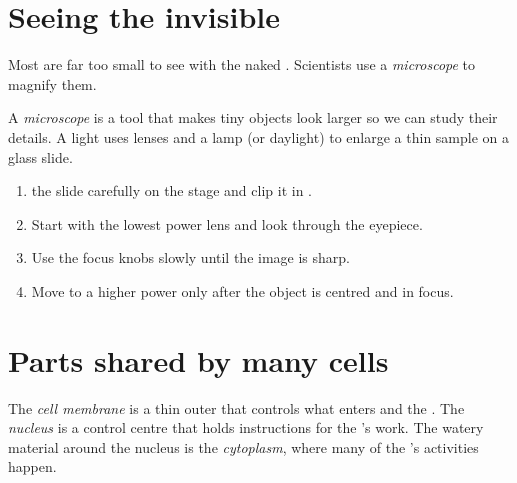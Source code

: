 \section{Seeing the invisible}

Most  are far too small to see with the naked . Scientists use
a \emph{microscope} to magnify them.

\begin{definition}[Microscope]\label{def:g4:cells:microscope}
A \emph{microscope} is a tool that makes tiny objects
look larger so we can study their details. A light  uses
lenses and a lamp (or daylight) to enlarge a thin sample on a glass
slide.
\end{definition}


\begin{method}\label{met:g4:cells:slide}
\begin{enumerate}
  \item {} the slide carefully on the stage and clip it in .
  \item Start with the lowest power lens and look through the eyepiece.
  \item Use the focus knobs slowly until the image is sharp.
  \item Move to a higher power only after the object is centred and in
        focus.
\end{enumerate}
\end{method}

\section{Parts shared by many cells}

\begin{definition}\label{def:g4:cells:parts}
The \emph{cell membrane} is a thin outer  that
controls what enters and  the . The
\emph{nucleus} is a control centre that holds
instructions for the 's work. The watery material around the nucleus
is the \emph{cytoplasm}, where many of the 's
activities happen.
\end{definition}



